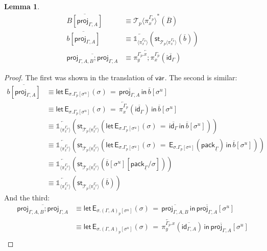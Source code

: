 \documentclass[10pt]{article}
\newtheorem{lemma}{Lemma}
\theoremstyle{definition}
\newcommand{\id}{\mathsf{id}}
\newcommand{\rewrite}[2]{\overleftarrow{#1}(#2)}
\newcommand\St[2]{\ensuremath{{#1}^*(#2)}}
\newcommand\StI[2]{\ensuremath{\mathsf{st}_{#1}(#2)}}
\newcommand\EEs[4]{\ensuremath{\mathsf{let} \, \mathsf{E}_{#1}(#3) \, = \, {#2} \, \mathsf{in} \, #4}}
\newcommand\EIs[2]{\ensuremath{\mathsf{E}_{#1}{(#2)}}}
\newcommand\ApEl[2]{\mathcal{T}_{#1}\langle#2\rangle}
\newcommand\pack[1]{\ensuremath{\mathsf{pack}_{#1}}}
\newcommand\unp[2]{\ensuremath{{#2}^u}}
\newcommand{\modeof}[1]{{#1}_p}
\newcommand{\upstairs}[1]{\overline{#1}}
\newcommand{\downstairs}[1]{\underline{#1}}
\newcommand\proj[1]{\ensuremath{\mathsf{proj}_{#1}}}
\newcommand\qvar[1]{\ensuremath{\mathsf{var}_{#1}}}
\newcommand\One{\ensuremath{\mathds{1}}}
\newcommand\ApOne[1]{\ensuremath{\One_{\langle {#1} \rangle }}}
\begin{document}
\begin{lemma}
\begin{align*}
\upstairs{B[\proj{\Gamma, A}]} &\equiv \St{\ApEl{p}{\pi^{\modeof{\Gamma}}_x}}{\upstairs{B}} \\
\upstairs{b[\proj{\Gamma, A}]} &\equiv \rewrite{\ApOne{\pi^{\modeof{\Gamma}}_x}}{\StI{\ApEl{p}{\pi^{\modeof{\Gamma}}_x}}{\upstairs{b}}} \\
\upstairs{\proj{\Gamma, A, B};\proj{\Gamma, A}} &\equiv \rewrite{\pi^{\modeof{\Gamma}.x}_y;\pi^{\modeof{\Gamma}}_x}{\upstairs{\id_{\Gamma}}}
\end{align*}
\end{lemma}
\begin{proof}
The first was shown in the translation of $\qvar{}$. The second is similar:
\begin{align*}
\upstairs{b[\proj{\Gamma, A}]}
&\equiv \EEs{\sigma.\modeof{\Gamma}[\unp{\Gamma}{\sigma}]}{\upstairs{\proj{\Gamma, A}}}{\sigma}{\upstairs{b}[\unp{\Gamma}{\sigma}]} \\
&\equiv \EEs{\sigma.\modeof{\Gamma}[\unp{\Gamma}{\sigma}]}{\rewrite{\pi^{\modeof{\Gamma}}_x}{\upstairs{\id_\Gamma}}}{\sigma}{\upstairs{b}[\unp{\Gamma}{\sigma}]} \\
&\equiv \rewrite{\ApOne{\pi^{\modeof{\Gamma}}_x}}{\StI{\ApEl{p}{\pi^{\modeof{\Gamma}}_x}}{\EEs{\sigma.\modeof{\Gamma}[\unp{\Gamma}{\sigma}]}{\upstairs{\id_\Gamma}}{\sigma}{\upstairs{b}[\unp{\Gamma}{\sigma}]}}} \\
&\equiv \rewrite{\ApOne{\pi^{\modeof{\Gamma}}_x}}{\StI{\ApEl{p}{\pi^{\modeof{\Gamma}}_x}}{\EEs{\sigma.\modeof{\Gamma}[\unp{\Gamma}{\sigma}]}{\EIs{\sigma.\modeof{\Gamma}[\unp{\Gamma}{\sigma}]}{\pack{\downstairs{\Gamma}}}}{\sigma}{\upstairs{b}[\unp{\Gamma}{\sigma}]}}} \\
&\equiv \rewrite{\ApOne{\pi^{\modeof{\Gamma}}_x}}{\StI{\ApEl{p}{\pi^{\modeof{\Gamma}}_x}}{\upstairs{b}[\unp{\Gamma}{\sigma}][\pack{\downstairs{\Gamma}}/\sigma]}} \\
&\equiv \rewrite{\ApOne{\pi^{\modeof{\Gamma}}_x}}{\StI{\ApEl{p}{\pi^{\modeof{\Gamma}}_x}}{\upstairs{b}}}
\end{align*}
And the third:
\begin{align*}
\upstairs{\proj{\Gamma, A, B};\proj{\Gamma, A}} 
&\equiv \EEs{\sigma.\modeof{(\Gamma, A)}[\unp{\Gamma, A}{\sigma}]}{\upstairs{\proj{\Gamma, A, B}}}{\sigma}{\upstairs{\proj{\Gamma, A}}[\unp{\upstairs{\Gamma, A}}{\sigma}]} \\
&\equiv \EEs{\sigma.\modeof{(\Gamma, A)}[\unp{\Gamma, A}{\sigma}]}{\rewrite{\pi^{\modeof{\Gamma}.x}_y}{\upstairs{\id_{\Gamma, A}}}}{\sigma}{\upstairs{\proj{\Gamma, A}}[\unp{\upstairs{\Gamma, A}}{\sigma}]} \\

\end{align*}
\end{proof}
\end{document}

